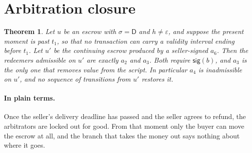 \documentclass[11pt]{article}
\newtheorem{theorem}{Theorem}
\theoremstyle{remark}
\newcommand{\Dd}{\mathsf{D}}
\newcommand{\sg}{\mathsf{sig}}
\begin{document}
\section{Arbitration closure}

\begin{theorem}
Let $u$ be an escrow with $\sigma = \Dd$ and $h \neq \varepsilon$, and suppose the present moment is past $t_1$, so
that no transaction can carry a validity interval ending before $t_1$. Let $u'$ be the continuing escrow produced by
a seller-signed $a_6$. Then the redeemers admissible on $u'$ are exactly $a_2$ and $a_3$. Both require $\sg(b)$, and
$a_3$ is the only one that removes value from the script. In particular $a_4$ is inadmissible on $u'$, and no
sequence of transitions from $u'$ restores it.
\end{theorem}

\paragraph{In plain terms.} Once the seller's delivery deadline has passed and the seller agrees to refund, the
arbitrators are locked out for good. From that moment only the buyer can move the escrow at all, and the branch that
takes the money out says nothing about where it goes.
\end{document}
